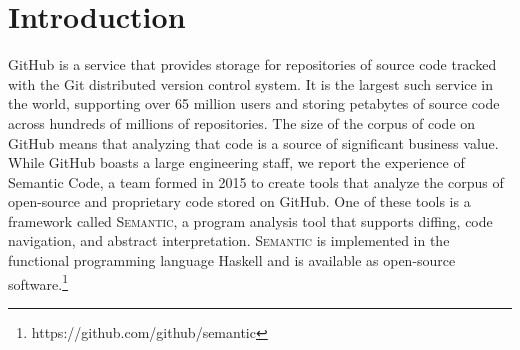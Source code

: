 \documentclass[acmsmall,fleqn]{acmart}
\begin{document}

\newcommand{\semantic}{\textsc{Semantic}}
\newcommand{\fe}{\textsc{Fused-Effects}}
\newcommand{\fastsum}{\textsc{Fastsum}}


\begin{abstract}
  GitHub hosts hundreds of millions of code repositories written in hundreds
  of different programming languages. In addition to its hosting services,
  GitHub provides data and insights into code, such as vulnerability analysis
  and code navigation, with which users can improve and understand their software
  development process. GitHub has built \semantic{}, a program analysis tool
  capable of parsing and extracting detailed information from source code. The
  development of \semantic{} has relied extensively on the functional
  programming literature; this paper describes how connections to academic
  research inspired and informed the development of an industrial-scale program
  analysis toolkit.
\end{abstract}


\maketitle


\section{Introduction}

GitHub is a service that provides storage for repositories of source code
tracked with the Git distributed version control system. It is the largest
such service in the world, supporting over 65 million users and storing
petabytes of source code across hundreds of millions of repositories. The
size of the corpus of code on GitHub means that analyzing that code is a
source of significant business value. While GitHub boasts a large
engineering staff, we report the experience of Semantic Code, a team formed
in 2015 to create tools that analyze the corpus of open-source and
proprietary code stored on GitHub. One of these tools is a framework called
\semantic{}, a program analysis tool that supports diffing, code navigation,
and abstract interpretation. \semantic{} is implemented in the functional
programming language Haskell and is available as open-source
software.\footnote{https://github.com/github/semantic}
\end{document}
